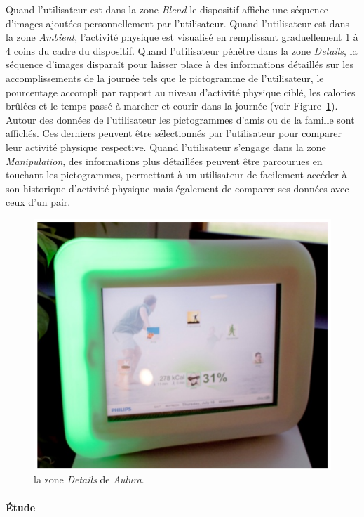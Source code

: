 \documentclass[10pt,a5paper,twoside]{article}
\begin{document}
Quand l'utilisateur est dans la zone \emph{Blend} le dispositif affiche
une séquence d'images ajoutées personnellement par l'utilisateur. Quand
l'utilisateur est dans la zone \emph{Ambient}, l'activité physique est
visualisé en remplissant graduellement 1 à 4 coins du cadre du
dispositif. Quand l'utilisateur pénètre dans la zone \emph{Details}, la
séquence d'images disparaît pour laisser place à des informations
détaillés sur les accomplissements de la journée tels que le pictogramme
de l'utilisateur, le pourcentage accompli par rapport au niveau
d'activité physique ciblé, les calories brûlées et le temps passé à
marcher et courir dans la journée (voir Figure~\ref{fig:aulura2}).
Autour des données de l'utilisateur les pictogrammes d'amis ou de la
famille sont affichés. Ces derniers peuvent être sélectionnés par
l'utilisateur pour comparer leur activité physique respective. Quand
l'utilisateur s'engage dans la zone \emph{Manipulation}, des
informations plus détaillées peuvent être parcourues en touchant les
pictogrammes, permettant à un utilisateur de facilement accéder à son
historique d'activité physique mais également de comparer ses données
avec ceux d'un pair.

\begin{figure}
\centering
\includegraphics[]{images/Aulura-screenshot2.png}
\caption{la zone \emph{Details} de \emph{Aulura}.}\label{fig:aulura2}
\end{figure}

\paragraph{Étude}\label{uxe9tude-3}
\end{document}
